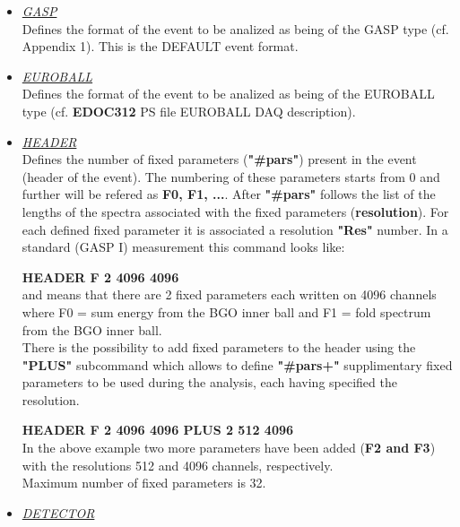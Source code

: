 \begin{itemize}

 \item	{\it\underline{GASP}} \\

	Defines the format of the event to be analized as being of the GASP
	type (cf. Appendix 1). This is the DEFAULT event format. 

 \item	{\it\underline{EUROBALL}} \\

	Defines the format of the event to be analized as being of the EUROBALL
	type (cf. {\bf EDOC312} PS file EUROBALL DAQ description).

 \item	{\it\underline{HEADER}} \\

 	Defines the number of fixed parameters ({\bf "\#pars"}) present in 
	the event (header of the event). The numbering of these parameters 
	starts from 0 and further will be refered as {\bf F0, F1, ...}. 
	After {\bf "\#pars"} follows the list of the lengths of the spectra 
	associated with the fixed parameters ({\bf resolution}). For each 
	defined
	fixed parameter it is associated a resolution {\bf "Res"} number. 
	In a standard (GASP I) measurement this command looks like:

	\hskip1cm  	{\bf HEADER F 2 4096 4096}\\
	and means that there are 2 fixed parameters each written on 
	4096 channels where F0 = sum energy from the BGO inner ball 
	and F1 = fold spectrum from the BGO inner ball. \\

	There is the possibility to add fixed parameters to the header using
	the {\bf "PLUS"} subcommand which allows to define {\bf "\#pars+"}
	supplimentary fixed parameters to be used during the analysis, each 
        having specified the resolution.

	\hskip1cm	{\bf HEADER F 2 4096 4096 PLUS 2 512 4096} \\
	In the above example two more parameters have been added ({\bf F2 and
	F3}) with the resolutions 512 and 4096 channels, respectively.\\

	Maximum number of fixed parameters is 32.

 \item	{\it\underline{DETECTOR}} \\


\end{itemize}
